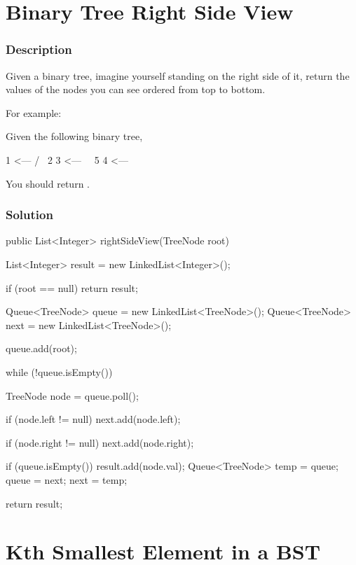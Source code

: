\newpage

\section{Binary Tree Right Side View} %

\subsubsection{Description}
Given a binary tree, imagine yourself standing on the right side of it, return the values of the nodes you can see ordered from top to bottom.

For example:

Given the following binary tree,
\begin{Code}
   1            <---
 /   \
2     3         <---
 \     \
  5     4       <---
\end{Code}

You should return \code{[1, 3, 4]}.

\subsubsection{Solution}

\begin{Code}
public List<Integer> rightSideView(TreeNode root) {
    List<Integer> result = new LinkedList<Integer>();

    if (root == null) {
        return result;
    }

    Queue<TreeNode> queue = new LinkedList<TreeNode>();
    Queue<TreeNode> next = new LinkedList<TreeNode>();

    queue.add(root);

    while (!queue.isEmpty()) {
        TreeNode node = queue.poll();

        if (node.left != null) {
            next.add(node.left);
        }

        if (node.right != null) {
            next.add(node.right);
        }

        if (queue.isEmpty()) {
            result.add(node.val);
            Queue<TreeNode> temp = queue;
            queue = next;
            next = temp;
        }
    }

    return result;
}
\end{Code}

\newpage

\section{Kth Smallest Element in a BST} %

